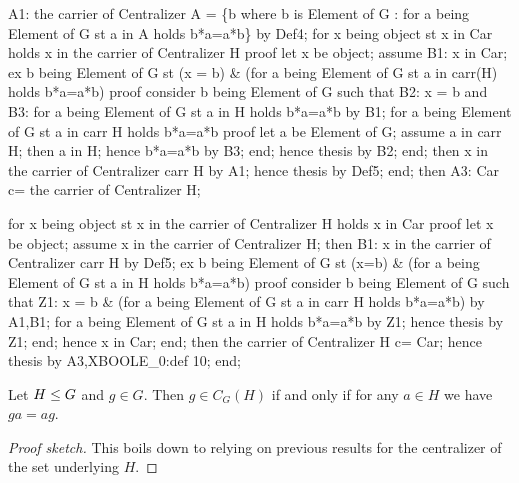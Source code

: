   A1: the carrier of Centralizer A = \{b where b is Element of G : for a
  being Element of G st a in A holds b*a=a*b\} by Def4;
  for x being object st x in Car holds x in the carrier of Centralizer H
  proof
    let x be object;
    assume B1: x in Car;
    ex b being Element of G
    st (x = b) & (for a being Element of G st a in carr(H) holds b*a=a*b)
    proof
      consider b being Element of G such that
      B2: x = b and
      B3: for a being Element of G st a in H holds b*a=a*b
      by B1;
      for a being Element of G st a in carr H holds b*a=a*b
      proof
        let a be Element of G;
        assume a in carr H;
        then a in H;
        hence b*a=a*b by B3;
      end;
      hence thesis by B2;
    end;
    then x in the carrier of Centralizer carr H by A1;
    hence thesis by Def5;
  end;
  then A3: Car c= the carrier of Centralizer H;

  for x being object st x in the carrier of Centralizer H holds x in Car
  proof
    let x be object;
    assume x in the carrier of Centralizer H;
    then B1: x in the carrier of Centralizer carr H by Def5;
    ex b being Element of G
    st (x=b) & (for a being Element of G st a in H holds b*a=a*b)
    proof
      consider b being Element of G such that
      Z1: x = b  & (for a being Element of G st a in carr H holds b*a=a*b)
      by A1,B1;
      for a being Element of G st a in H holds b*a=a*b by Z1;
      hence thesis by Z1;
    end;
    hence x in Car;
  end;
  then the carrier of Centralizer H c= Car;
  hence thesis by A3,XBOOLE_0:def 10;
end;

\eatline
{}\nwendcode{}\nwdocspar
\begin{theorem}
Let $H\leq G$ and $g\in G$.
Then $g\in C_{G}(H)$ if and only if for any $a\in H$ we have $ga=ag$.
\end{theorem}

\begin{proof}[Proof sketch]
This boils down to relying on previous results for the centralizer of
the set underlying $H$.
\end{proof}


